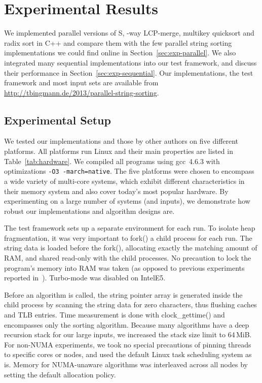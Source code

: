 \documentclass[a4paper]{myjournal}
\begin{document}
\section{Experimental Results}\label{sec:experiments}

We implemented parallel versions of S, -way LCP-merge, multikey quicksort
and radix sort in C++ and compare them with the few parallel string sorting
implementations we could find online in Section~\ref{sec:exp-parallel}.  We also
integrated many sequential implementations into our test framework, and discuss
their performance in Section~\ref{sec:exp-sequential}. Our implementations, the
test framework and most input sets are available from
\url{http://tbingmann.de/2013/parallel-string-sorting}.

\subsection{Experimental Setup}\label{sec:exp-setup}

We tested our implementations and those by other authors on five different
platforms.  All platforms run Linux and their main properties are listed in
Table~\ref{tab:hardware}.  We compiled all programs using gcc~4.6.3 with
optimizations \texttt{-O3 -march=native}.  The five platforms were chosen to
encompass a wide variety of multi-core systems, which exhibit different
characteristics in their memory system and also cover today's most popular
hardware.  By experimenting on a large number of systems (and inputs), we
demonstrate how robust our implementations and algorithm designs are.

The test framework sets up a separate environment for each run.  To isolate heap
fragmentation, it was very important to fork() a child process for each run.
The string data is loaded before the fork(), allocating exactly the matching
amount of RAM, and shared read-only with the child processes. No precaution to
lock the program's memory into RAM was taken (as opposed to previous experiments
reported in~\cite{bingmann2013parallel}). Turbo-mode was disabled on IntelE5.

Before an algorithm is called, the string pointer array is generated inside the
child process by scanning the string data for zero characters, thus flushing
caches and TLB entries. Time measurement is done with clock\_gettime() and
encompasses only the sorting algorithm. Because many algorithms have a deep
recursion stack for our large inputs, we increased the stack size limit to
64\,MiB. For non-NUMA experiments, we took no special precautions of pinning
threads to specific cores or nodes, and used the default Linux task scheduling
system as is. Memory for NUMA-unaware algorithms was interleaved across all
nodes by setting the default allocation policy.
\end{document}
